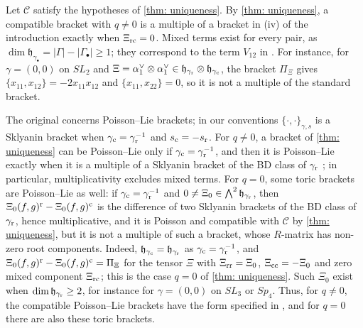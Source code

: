 \documentclass[a4paper]{amsart}
\numberwithin{equation}{section}
\theoremstyle{definition}
\theoremstyle{remark}
\newcommand{\mfh}{\mathfrak{h}}
\newcommand{\mcC}{\mathcal{C}}
\newcommand{\rr}{{\rm r}}
\newcommand{\cc}{{\rm c}}
\newcommand{\toric}{\Pi}
\begin{document}
\begin{remark}
  \label{rmk: v}
  Let $\mcC$ satisfy the hypotheses of \cref{thm: uniqueness}.
  By \cref{thm: uniqueness}, a compatible bracket with $q\neq0$ is a multiple of a bracket in (iv) of the introduction exactly when $\Xi_{\rm rc}=0$.
  Mixed terms exist for every pair, as $\dim\mfh_{\gamma_\bullet}=|\Gamma|-|\Gamma_\bullet|\ge1$; they correspond to the term $V_{12}$ in \cite[Section~4]{GSV11}.
  For instance, for $\gamma=(0,0)$ on $SL_2$ and $\Xi=\alpha_1^\vee\otimes\alpha_1^\vee\in\mfh_{\gamma_{\rr}}\otimes\mfh_{\gamma_{\cc}}$, the bracket $\toric_\Xi$ gives $\{x_{11},x_{12}\}=-2x_{11}x_{12}$ and $\{x_{11},x_{22}\}=0$, so it is not a multiple of the standard bracket.

  The original \cite[Conjecture~3.2(v)]{GSV11} concerns Poisson--Lie brackets; in our conventions $\{\cdot,\cdot\}_{\gamma,s}$ is a Sklyanin bracket when $\gamma_{\cc}=\gamma_{\rr}^{-1}$ and $s_{\cc}=-s_{\rr}$.
  For $q\neq0$, a bracket of \cref{thm: uniqueness} can be Poisson--Lie only if $\gamma_{\cc}=\gamma_{\rr}^{-1}$, and then it is Poisson--Lie exactly when it is a multiple of a Sklyanin bracket of the BD class of $\gamma_{\rr}$ \cite[Lemma~4.3(ii)]{GSV11}; in particular, multiplicativity excludes mixed terms.
  For $q=0$, some toric brackets are Poisson--Lie as well: if $\gamma_{\cc}=\gamma_{\rr}^{-1}$ and $0\neq\Xi_0\in\bigwedge^2\mfh_{\gamma_{\rr}}$, then $\Xi_0(f,g)^\rr-\Xi_0(f,g)^\cc$ is the difference of two Sklyanin brackets of the BD class of $\gamma_{\rr}$, hence multiplicative, and it is Poisson and compatible with $\mcC$ by \cref{thm: uniqueness}, but it is not a multiple of such a bracket, whose $R$-matrix has non-zero root components.
  Indeed, $\mfh_{\gamma_{\cc}}=\mfh_{\gamma_{\rr}}$ as $\gamma_{\cc}=\gamma_{\rr}^{-1}$, and $\Xi_0(f,g)^\rr-\Xi_0(f,g)^\cc=\toric_\Xi$ for the tensor $\Xi$ with $\Xi_{\rm rr}=\Xi_0$, $\Xi_{\rm cc}=-\Xi_0$ and zero mixed component $\Xi_{\rm rc}$; this is the case $q=0$ of \cref{thm: uniqueness}.
  Such $\Xi_0$ exist when $\dim\mfh_{\gamma_{\rr}}\ge2$, for instance for $\gamma=(0,0)$ on $SL_3$ or $Sp_4$.
  Thus, for $q\neq0$, the compatible Poisson--Lie brackets have the form specified in \cite[Conjecture~3.2(v)]{GSV11}, and for $q=0$ there are also these toric brackets.
\end{remark}



\end{document}
